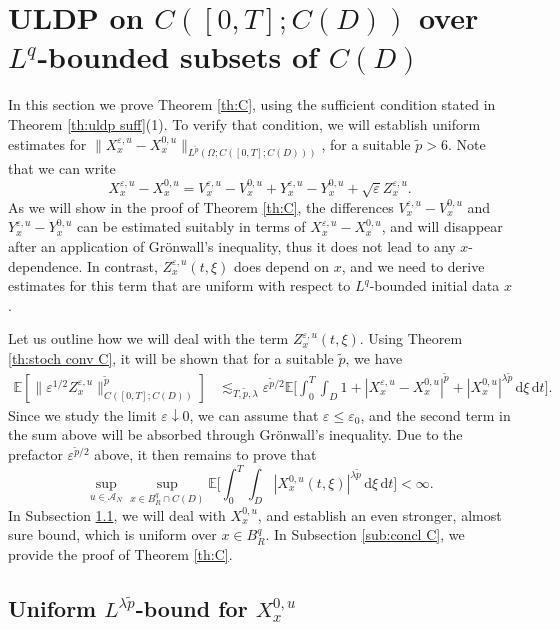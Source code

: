 \documentclass{amsart}
\theoremstyle{plain}
\theoremstyle{remark}
\theoremstyle{plain}
\numberwithin{equation}{section}
\newcommand{\Cper}{C(D)}
\newcommand{\E}{{\mathbb E}}
\newcommand{\eps}{\varepsilon}
\newcommand{\Om}{\Omega}
\newcommand{\A}{{\mathcal A}}
\newcommand{\dd}{\,\mathrm{d}}
\begin{document}
\section{ULDP on $C([0,T];\Cper)$ over $L^q$-bounded subsets of $\Cper$}\label{sec:C}

In this section we prove Theorem \ref{th:C}, using the sufficient condition stated in Theorem \ref{th:uldp suff}(1). 
To verify that condition, we will establish uniform estimates for $\|X_x^{\eps,u}-X_x^{0,u}\|_{L^{\tilde p}(\Om;C([0,T];\Cper))}$, for a suitable $\tilde p>6$. Note that we can write
\[
X_x^{\eps,u}-X_x^{0,u}=V_x^{\eps,u}-V_x^{0,u}+Y_x^{\eps,u}-Y_x^{0,u}+\sqrt{\eps}Z_x^{\eps,u}. 
\] 
As we will show in the proof of Theorem \ref{th:C}, the differences $V_x^{\eps,u}-V_x^{0,u}$ and $Y_x^{\eps,u}-Y_x^{0,u}$ can be estimated suitably in terms of $X_x^{\eps,u}-X_x^{0,u}$, and will disappear after an application of  Gr\"onwall's inequality, thus it does not lead to any $x$-dependence. In contrast, $Z_x^{\eps,u}(t,\xi)$ does depend on $x$, and we need to derive   estimates  for this term that are uniform with respect to $L^q$-bounded initial data $x$. 

Let us outline how we will deal with the term  $Z_x^{\eps,u}(t,\xi)$. 
Using Theorem \ref{th:stoch conv C}, it will be shown that for a suitable $\tilde p$, we have
\begin{align*}
\E[\|\eps^{1/2}Z_x^{\eps,u} \|_{C([0,T];C(D))}^{\tilde p}]
&\lesssim_{T, \tilde p,\lambda}\eps^{\tilde p/2}\E\Big[\int_0^T\int_D 1+ |X_x^{\eps,u}-X_x^{0,u}|^{\tilde p}+|X_x^{0,u}|^{\lambda \tilde p}\dd\xi\dd t\Big].  
\end{align*} 
Since we study the limit $\eps\downarrow 0$, we can assume that $\eps\leq \eps_0$, and the second term in the sum above will be absorbed through Gr\"onwall's inequality. 
Due to the prefactor $\eps^{\tilde p/2}$ above, it then remains to prove that  
\begin{equation*} 
  \sup_{u\in\A_N}\sup_{x\in B_R^q\cap C(D)} \E\Big[\int_0^T\int_D  |X_x^{0,u}(t,\xi)|^{\lambda \tilde p}\dd\xi\dd t\Big]<\infty.
\end{equation*} 
In Subsection \ref{sub:I2 C}, we will deal with $X_x^{0,u}$, and establish an even stronger, almost sure bound, which is uniform over $x\in B^q_R$. In Subsection \ref{sub:concl C}, we provide the proof of Theorem \ref{th:C}. 



\subsection{Uniform $L^{\lambda\tilde p}$-bound for $X_x^{0,u}$}\label{sub:I2 C}
\end{document}
